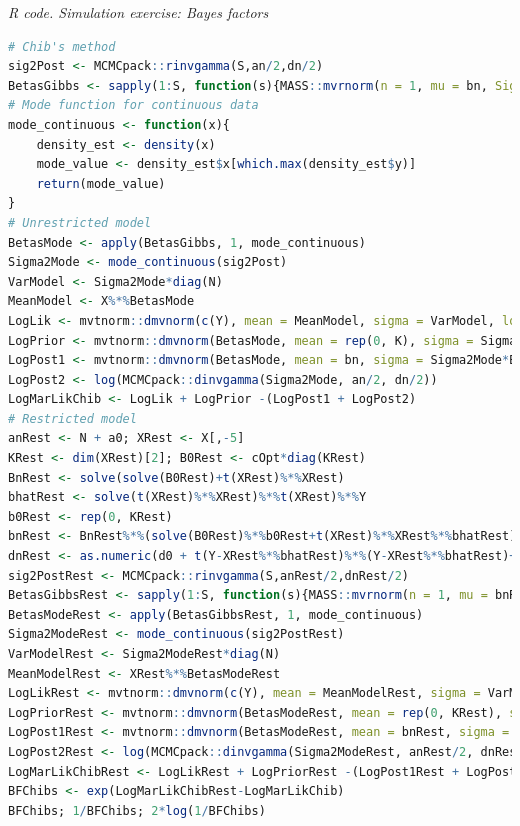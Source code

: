 \begin{tcolorbox}[enhanced,width=4.67in,center upper,
	fontupper=\large\bfseries,drop shadow southwest,sharp corners]
	\textit{R code. Simulation exercise: Bayes factors}
	\begin{VF}
		\begin{lstlisting}[language=R]
# Chib's method
sig2Post <- MCMCpack::rinvgamma(S,an/2,dn/2)
BetasGibbs <- sapply(1:S, function(s){MASS::mvrnorm(n = 1, mu = bn, Sigma = sig2Post[s]*Bn)})
# Mode function for continuous data
mode_continuous <- function(x){
	density_est <- density(x)       
	mode_value <- density_est$x[which.max(density_est$y)]  
	return(mode_value)
}
# Unrestricted model
BetasMode <- apply(BetasGibbs, 1, mode_continuous)
Sigma2Mode <- mode_continuous(sig2Post)
VarModel <- Sigma2Mode*diag(N)
MeanModel <- X%*%BetasMode
LogLik <- mvtnorm::dmvnorm(c(Y), mean = MeanModel, sigma = VarModel, log = TRUE, checkSymmetry = TRUE)
LogPrior <- mvtnorm::dmvnorm(BetasMode, mean = rep(0, K), sigma = Sigma2Mode*cOpt*diag(K), log = TRUE, checkSymmetry = TRUE)+log(MCMCpack::dinvgamma(Sigma2Mode, a0/2, d0/2))
LogPost1 <- mvtnorm::dmvnorm(BetasMode, mean = bn, sigma = Sigma2Mode*Bn, log = TRUE, checkSymmetry = TRUE)
LogPost2 <- log(MCMCpack::dinvgamma(Sigma2Mode, an/2, dn/2))
LogMarLikChib <- LogLik + LogPrior -(LogPost1 + LogPost2)
# Restricted model
anRest <- N + a0; XRest <- X[,-5]
KRest <- dim(XRest)[2]; B0Rest <- cOpt*diag(KRest) 
BnRest <- solve(solve(B0Rest)+t(XRest)%*%XRest)
bhatRest <- solve(t(XRest)%*%XRest)%*%t(XRest)%*%Y
b0Rest <- rep(0, KRest)
bnRest <- BnRest%*%(solve(B0Rest)%*%b0Rest+t(XRest)%*%XRest%*%bhatRest)
dnRest <- as.numeric(d0 + t(Y-XRest%*%bhatRest)%*%(Y-XRest%*%bhatRest)+t(bhatRest - b0Rest)%*%solve(solve(t(XRest)%*%XRest)+B0Rest)%*%(bhatRest - b0Rest))
sig2PostRest <- MCMCpack::rinvgamma(S,anRest/2,dnRest/2)
BetasGibbsRest <- sapply(1:S, function(s){MASS::mvrnorm(n = 1, mu = bnRest, Sigma = sig2PostRest[s]*BnRest)})
BetasModeRest <- apply(BetasGibbsRest, 1, mode_continuous)
Sigma2ModeRest <- mode_continuous(sig2PostRest)
VarModelRest <- Sigma2ModeRest*diag(N)
MeanModelRest <- XRest%*%BetasModeRest
LogLikRest <- mvtnorm::dmvnorm(c(Y), mean = MeanModelRest, sigma = VarModelRest, log = TRUE, checkSymmetry = TRUE)
LogPriorRest <- mvtnorm::dmvnorm(BetasModeRest, mean = rep(0, KRest), sigma = Sigma2ModeRest*cOpt*diag(KRest), log = TRUE, checkSymmetry = TRUE)+log(MCMCpack::dinvgamma(Sigma2ModeRest, a0/2, d0/2))
LogPost1Rest <- mvtnorm::dmvnorm(BetasModeRest, mean = bnRest, sigma = Sigma2ModeRest*BnRest, log = TRUE, checkSymmetry = TRUE)
LogPost2Rest <- log(MCMCpack::dinvgamma(Sigma2ModeRest, anRest/2, dnRest/2))
LogMarLikChibRest <- LogLikRest + LogPriorRest -(LogPost1Rest + LogPost2Rest)
BFChibs <- exp(LogMarLikChibRest-LogMarLikChib)
BFChibs; 1/BFChibs; 2*log(1/BFChibs)
\end{lstlisting}
\end{VF}
\end{tcolorbox}


